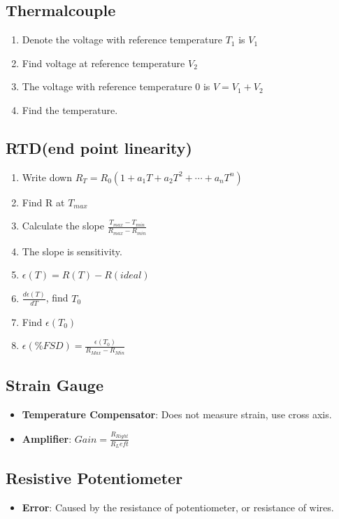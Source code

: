 \documentclass{article}
\begin{document}
	\subsection{Thermalcouple}
	\begin{enumerate}
		\item Denote the voltage with reference temperature $T_1$ is $V_1$
		\item Find voltage at reference temperature $V_2$
		\item The voltage with reference temperature 0 is $V = V_1 + V_2$
		\item Find the temperature.
	\end{enumerate}  
	
	\subsection{RTD(end point linearity)}
	\begin{enumerate}
		\item Write down $R_T = R_0(1+a_1T + a_2T^2 + \cdots + a_nT^n)$
		\item Find R at $T_{max}$
		\item Calculate the slope $\frac{T_{max}-T_{min}}{R_{max} - R_{min}}$
		\item The slope is sensitivity.
		\item $\epsilon(T) = R(T) - R(ideal)$
		\item $\frac{d\epsilon (T)}{dT}$, find $T_0$
		\item Find $\epsilon (T_0)$
		\item $\epsilon(\% FSD) = \frac{\epsilon (T_0)}{R_{Max} - R_{Min}}$
	\end{enumerate}
	
	\subsection{Strain Gauge}
	\begin{itemize}
		\item \textbf{Temperature Compensator}: Does not measure strain, use cross axis.
		\item \textbf{Amplifier}: $Gain = \frac{R_{Right}}{R_Left}$
	\end{itemize}
	
	\subsection{Resistive Potentiometer}
	\begin{itemize}
		\item \textbf{Error}: Caused by the resistance of potentiometer, or resistance of wires.
	\end{itemize}
	
\end{document}
